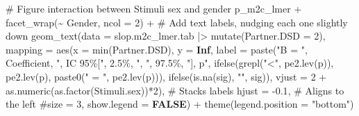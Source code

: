 \documentclass[
  bookmarksnumbered]{article}
\newenvironment{Shaded}{\begin{snugshade}}{\end{snugshade}}
\newcommand{\AttributeTok}[1]{\textcolor[rgb]{0.80,0.80,0.80}{#1}}
\newcommand{\CommentTok}[1]{\textcolor[rgb]{0.50,0.62,0.50}{#1}}
\newcommand{\ConstantTok}[1]{\textcolor[rgb]{0.86,0.64,0.64}{\textbf{#1}}}
\newcommand{\DecValTok}[1]{\textcolor[rgb]{0.86,0.86,0.80}{#1}}
\newcommand{\FloatTok}[1]{\textcolor[rgb]{0.75,0.75,0.82}{#1}}
\newcommand{\FunctionTok}[1]{\textcolor[rgb]{0.94,0.94,0.56}{#1}}
\newcommand{\NormalTok}[1]{\textcolor[rgb]{0.80,0.80,0.80}{#1}}
\newcommand{\SpecialCharTok}[1]{\textcolor[rgb]{0.86,0.64,0.64}{#1}}
\newcommand{\StringTok}[1]{\textcolor[rgb]{0.80,0.58,0.58}{#1}}
\begin{document}
\begin{Shaded}
\begin{Highlighting}[]
\CommentTok{\# Figure interaction between Stimuli sex and gender}
\NormalTok{p\_m2c\_lmer  }\SpecialCharTok{+}
  \FunctionTok{facet\_wrap}\NormalTok{(}\SpecialCharTok{\textasciitilde{}}\NormalTok{ Gender, }\AttributeTok{ncol =} \DecValTok{2}\NormalTok{) }\SpecialCharTok{+}
  \CommentTok{\# Add text labels, nudging each one slightly down}
  \FunctionTok{geom\_text}\NormalTok{(}\AttributeTok{data =}\NormalTok{ slop.m2c\_lmer.tab }\SpecialCharTok{|\textgreater{}} 
              \FunctionTok{mutate}\NormalTok{(}\AttributeTok{Partner.DSD =} \DecValTok{2}\NormalTok{),}
            \AttributeTok{mapping =} \FunctionTok{aes}\NormalTok{(}\AttributeTok{x =} \FunctionTok{min}\NormalTok{(Partner.DSD), }\AttributeTok{y =} \ConstantTok{Inf}\NormalTok{, }
                          \AttributeTok{label =} \FunctionTok{paste}\NormalTok{(}\StringTok{"B = "}\NormalTok{, Coefficient, }
                                        \StringTok{", IC 95\%["}\NormalTok{, }\StringTok{\textasciigrave{}}\AttributeTok{2.5\%}\StringTok{\textasciigrave{}}\NormalTok{, }\StringTok{", "}\NormalTok{, }\StringTok{\textasciigrave{}}\AttributeTok{97.5\%}\StringTok{\textasciigrave{}}\NormalTok{, }
                                        \StringTok{"], p"}\NormalTok{, }
                                        \FunctionTok{ifelse}\NormalTok{(}\FunctionTok{grepl}\NormalTok{(}\StringTok{"\textless{}"}\NormalTok{, }\FunctionTok{pe2.lev}\NormalTok{(p)), }\FunctionTok{pe2.lev}\NormalTok{(p), }
                                               \FunctionTok{paste0}\NormalTok{(}\StringTok{" = "}\NormalTok{, }\FunctionTok{pe2.lev}\NormalTok{(p))),}
                                        \FunctionTok{ifelse}\NormalTok{(}\FunctionTok{is.na}\NormalTok{(sig), }\StringTok{""}\NormalTok{, sig)),}
                          \AttributeTok{vjust =} \DecValTok{2} \SpecialCharTok{+} \FunctionTok{as.numeric}\NormalTok{(}\FunctionTok{as.factor}\NormalTok{(Stimuli.sex))}\SpecialCharTok{*}\DecValTok{2}\NormalTok{),  }\CommentTok{\# Stacks labels}
            \AttributeTok{hjust =} \SpecialCharTok{{-}}\FloatTok{0.1}\NormalTok{,  }\CommentTok{\# Aligns to the left}
            \CommentTok{\#size = 3,}
            \AttributeTok{show.legend =} \ConstantTok{FALSE}\NormalTok{) }\SpecialCharTok{+}
  \FunctionTok{theme}\NormalTok{(}\AttributeTok{legend.position =} \StringTok{"bottom"}\NormalTok{)}
\end{Highlighting}
\end{Shaded}
\end{document}
